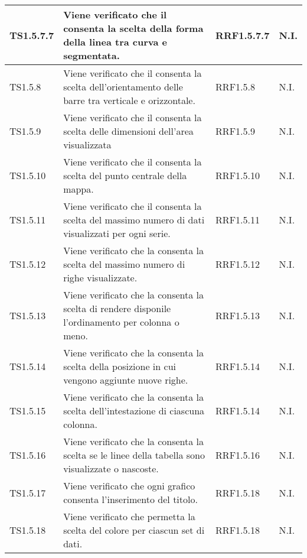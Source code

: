 \begin{longtabu}{| X[0.5] | X | X[0.5] | X[0.4] |}
TS1.5.7.7 &	Viene verificato che il  consenta la scelta della forma della linea tra curva e segmentata. & RRF1.5.7.7 & N.I.\\ \hline

TS1.5.8 & Viene verificato che il  consenta la scelta dell'orientamento delle barre tra verticale e orizzontale. & RRF1.5.8 & N.I.\\ \hline

TS1.5.9 & Viene verificato che il  consenta la scelta delle dimensioni dell'area visualizzata & RRF1.5.9 & N.I.\\ \hline

TS1.5.10 & Viene verificato che il  consenta la scelta del punto centrale della mappa. & RRF1.5.10 & N.I.\\ \hline

TS1.5.11 &	Viene verificato che il  consenta la scelta del massimo numero di dati visualizzati per ogni serie. & RRF1.5.11 & N.I.\\ \hline

TS1.5.12 & Viene verificato che la  consenta la scelta del massimo numero di righe visualizzate. & RRF1.5.12 & N.I.\\ \hline

TS1.5.13 &	Viene verificato che la  consenta la scelta di rendere disponile l'ordinamento per colonna o meno. & RRF1.5.13 & N.I.\\ \hline

TS1.5.14 & Viene verificato che la  consenta la scelta della posizione in cui vengono aggiunte nuove righe. & RRF1.5.14 & N.I.\\ \hline

TS1.5.15 & Viene verificato che la  consenta la scelta dell'intestazione di ciascuna colonna. & RRF1.5.14 & N.I.\\ \hline
 
TS1.5.16 & Viene verificato che la  consenta la scelta se le linee della tabella sono visualizzate o nascoste. & RRF1.5.16 & N.I.\\ \hline

TS1.5.17 & Viene verificato che ogni grafico consenta l'inserimento del titolo. & RRF1.5.18 & N.I.\\ \hline

TS1.5.18 & Viene verificato che  permetta la scelta del colore per ciascun set di dati. & RRF1.5.18 & N.I.\\ \hline


\end{longtabu}
